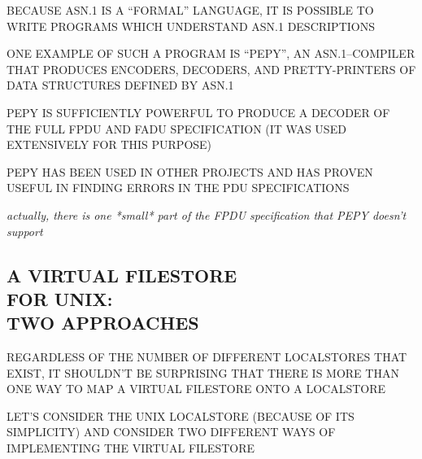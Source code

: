 \begin{bwslide}

\begin{nrtc}
\item	BECAUSE ASN.1 IS A ``FORMAL'' LANGUAGE, IT IS POSSIBLE TO WRITE
	PROGRAMS WHICH UNDERSTAND ASN.1 DESCRIPTIONS

\item	ONE EXAMPLE OF SUCH A PROGRAM IS ``PEPY'', AN ASN.1--COMPILER THAT
	PRODUCES ENCODERS, DECODERS, AND PRETTY-PRINTERS OF DATA STRUCTURES
	DEFINED BY ASN.1

\item	PEPY IS SUFFICIENTLY POWERFUL TO PRODUCE A DECODER OF THE FULL FPDU
	AND FADU SPECIFICATION (IT WAS USED EXTENSIVELY FOR THIS PURPOSE)

\item	PEPY HAS BEEN USED IN OTHER PROJECTS AND HAS PROVEN USEFUL IN
	FINDING ERRORS IN THE PDU SPECIFICATIONS
\end{nrtc}
\end{bwslide}


\begin{note}\em
actually, there is one *small* part of the FPDU specification that PEPY
doesn't support
\end{note}


\begin{bwslide}
\part*	{A VIRTUAL FILESTORE\\ FOR UNIX:\\ TWO APPROACHES}\bf

\begin{nrtc}
\item	REGARDLESS OF THE NUMBER OF DIFFERENT LOCALSTORES THAT EXIST,
	IT SHOULDN'T BE SURPRISING THAT THERE IS MORE THAN ONE WAY TO MAP A
	VIRTUAL FILESTORE ONTO A LOCALSTORE

\item	LET'S CONSIDER THE UNIX LOCALSTORE (BECAUSE OF ITS SIMPLICITY) AND
	CONSIDER TWO DIFFERENT WAYS OF IMPLEMENTING THE VIRTUAL FILESTORE
\end{nrtc}
\end{bwslide}


